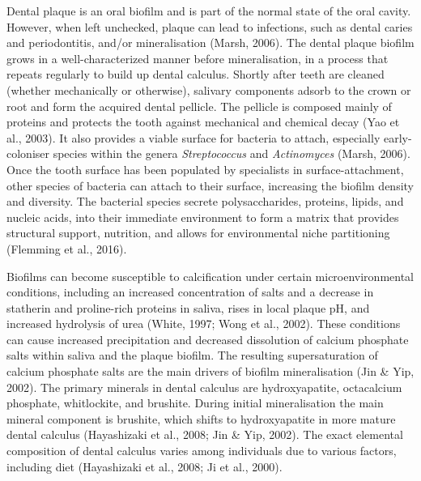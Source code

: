 \documentclass[
]{article}
\begin{document}
Dental plaque is an oral biofilm and is part of the normal state of the
oral cavity. However, when left unchecked, plaque can lead to
infections, such as dental caries and periodontitis, and/or
mineralisation (Marsh, 2006). The dental plaque biofilm grows in a
well-characterized manner before mineralisation, in a process that
repeats regularly to build up dental calculus. Shortly after teeth are
cleaned (whether mechanically or otherwise), salivary components adsorb
to the crown or root and form the acquired dental pellicle. The pellicle
is composed mainly of proteins and protects the tooth against mechanical
and chemical decay (Yao et al., 2003). It also provides a viable surface
for bacteria to attach, especially early-coloniser species within the
genera \emph{Streptococcus} and \emph{Actinomyces} (Marsh, 2006). Once
the tooth surface has been populated by specialists in
surface-attachment, other species of bacteria can attach to their
surface, increasing the biofilm density and diversity. The bacterial
species secrete polysaccharides, proteins, lipids, and nucleic acids,
into their immediate environment to form a matrix that provides
structural support, nutrition, and allows for environmental niche
partitioning (Flemming et al., 2016).

Biofilms can become susceptible to calcification under certain
microenvironmental conditions, including an increased concentration of
salts and a decrease in statherin and proline-rich proteins in saliva,
rises in local plaque pH, and increased hydrolysis of urea (White, 1997;
Wong et al., 2002). These conditions can cause increased precipitation
and decreased dissolution of calcium phosphate salts within saliva and
the plaque biofilm. The resulting supersaturation of calcium phosphate
salts are the main drivers of biofilm mineralisation (Jin \& Yip, 2002).
The primary minerals in dental calculus are hydroxyapatite, octacalcium
phosphate, whitlockite, and brushite. During initial mineralisation the
main mineral component is brushite, which shifts to hydroxyapatite in
more mature dental calculus (Hayashizaki et al., 2008; Jin \& Yip,
2002). The exact elemental composition of dental calculus varies among
individuals due to various factors, including diet (Hayashizaki et al.,
2008; Ji et al., 2000).
\end{document}
